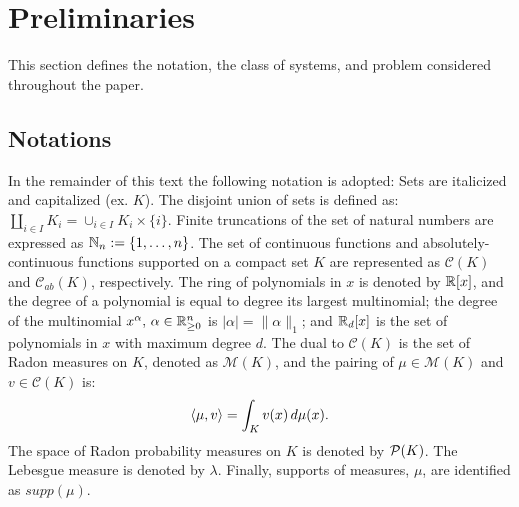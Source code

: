   \section{Preliminaries}
\label{sec:preliminaries}
  This section defines the notation, the class of systems, and problem considered throughout the paper.

  \subsection{Notations}
  In the remainder of this text the following notation is adopted: 
Sets are italicized and capitalized (ex. $K$). 
The disjoint union of sets is defined as: $\coprod_{i\in I}K_i=\cup_{i\in I}K_i\times \{i\}$. 
Finite truncations of the set of natural numbers are expressed as \mbox{$\mathbb{N}_n:=\{1,\ldots,n\}$}. 
The set of continuous functions and absolutely-continuous functions supported on a compact set $K$ are represented as $\mathcal C(K)$ and $\mathcal C_{ab}(K)$, respectively. 
The ring of polynomials in $x$ is denoted by $\mathbb{R}[x]$, and the degree of a polynomial is equal to degree its largest multinomial; the degree of the multinomial $x^\alpha,\,\alpha\in \mathbb{R}_{\ge 0}^n$ is $|\alpha|=\|\alpha\|_1$; and $\mathbb{R}_d[x]$ is the set of polynomials in $x$ with maximum degree $d$. 
The dual to $\mathcal C(K)$ is the set of Radon measures on $K$, denoted as $\mathcal M(K)$, and the pairing of $\mu\in \mathcal M(K)$ and $v\in \mathcal C(K)$ is:
  \begin{align}
  \left\langle \mu,v\right\rangle=\int_{K}v(x)\,d\mu(x).
  \end{align}
The space of Radon probability measures on $K$ is denoted by ${\cal P}(K)$.
The Lebesgue measure is denoted by $\lambda$. 
Finally, supports of measures, $\mu$, are identified as $supp(\mu)$.

